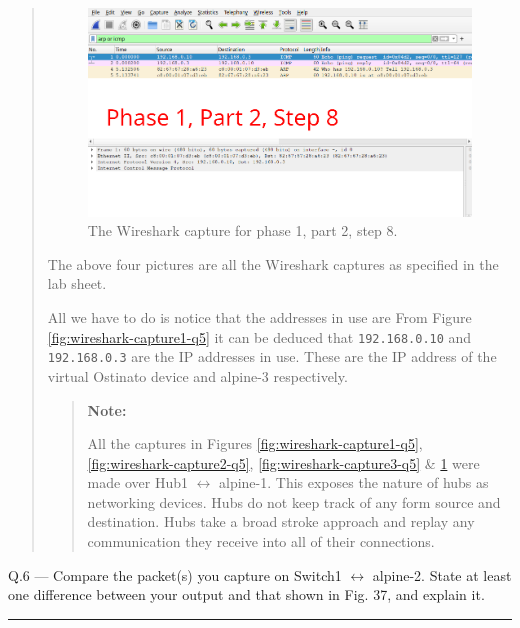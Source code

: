 \documentclass{article}
\newcommand\Que[2]{%
   \begin{samepage}
   \leavevmode\par
   \noindent
   Q.#1 --- #2\par\vspace{10pt}\hrule\vspace{10pt}
   \end{samepage}}
\newenvironment{ans}
   {\fbox{Answer}\begin{quote}\nopagebreak}
   {\end{quote}}
\newenvironment{note}{%
    \begin{quote}
    \textbf{Note:}%
}{%
    \end{quote}%
}
\begin{document}
\begin{ans}
	\begin{figure}[H]
		\centering
		\includegraphics[width=14cm]{data/q5-capture4.png}
		\caption{The Wireshark capture for phase 1, part 2, step 8.}
		\label{fig:wireshark-capture4-q5}
	\end{figure}
	
	The above four pictures are all the Wireshark captures as
	specified in the lab sheet.
	
	All we have to do is notice that the addresses in use are
	From Figure \ref{fig:wireshark-capture1-q5} it can be deduced
	that \texttt{192.168.0.10} and \texttt{192.168.0.3} are the IP
	addresses in use. These are the IP address of the virtual Ostinato
	device and alpine-3 respectively.
	
	
	\begin{note}
		All the captures in Figures \ref{fig:wireshark-capture1-q5},
		\ref{fig:wireshark-capture2-q5}, \ref{fig:wireshark-capture3-q5}
		\& \ref{fig:wireshark-capture4-q5} were made over Hub1 $\leftrightarrow$
		alpine-1. This exposes the nature of hubs as networking devices.
		Hubs do not keep track of any form source and destination. Hubs
		take a broad stroke approach and replay any communication they
		receive into all of their connections.
	\end{note}
\end{ans}

\Que{6}{Compare the packet(s) you capture on Switch1
$\leftrightarrow$ alpine-2. State at least one difference
between your output and that shown in Fig. 37, and explain it.}
\end{document}
